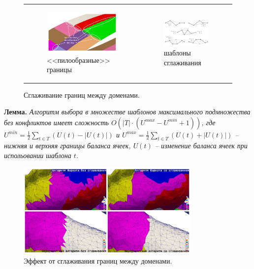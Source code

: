 \documentclass[a4paper,14pt]{extarticle}                     %
\theoremstyle{plain}                                         %
\begin{document}
\begin{figure}[ht]
\centering
\begin{tabular}{ll}
\begin{subfigure}{0.5\textwidth}\centering\includegraphics[width=0.75\columnwidth]{fig/par_bad-border.pdf}\caption{<<пилообразные>> границы}\end{subfigure} &
\begin{subfigure}{0.5\textwidth}\centering\includegraphics[width=0.75\columnwidth]{fig/par_smooth-border.pdf}\caption{шаблоны сглаживания}\end{subfigure}
\end{tabular}
\singlespacing
\caption{Сглаживание границ между доменами.}
\label{fig:par_smooth_borders}
\end{figure}

\textbf{Лемма.} \textit{Алгоритм выбора в множестве шаблонов максимального подмножества без конфликтов имеет сложность $O \left( |T| \cdot (U^{max} - U^{min} + 1) \right)$, где $U^{min} = \frac{1}{2} \sum_{t \in T}{(U(t) - |U(t)|)}$ и $U^{max} = \frac{1}{2} \sum_{t \in T}{(U(t) + |U(t)|)}$ -- нижняя и верхняя границы баланса ячеек, $U(t)$ -- изменение баланса ячеек при испольовании шаблона $t$.}

\begin{figure}[!ht]
\centering
\includegraphics[width=0.8\textwidth]{fig/par_dragon_decomp2.pdf}
\singlespacing
\caption{Эффект от сглаживания границ между доменами.}
\label{fig:text_2_smooth_decomp2}
\end{figure}
\end{document}
